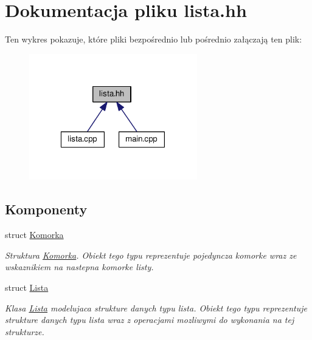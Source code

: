 \hypertarget{lista_8hh}{\section{Dokumentacja pliku lista.\-hh}
\label{lista_8hh}
}
Ten wykres pokazuje, które pliki bezpośrednio lub pośrednio załączają ten plik\-:
\nopagebreak
\begin{figure}[H]
\begin{center}
\leavevmode
\includegraphics[width=207pt]{lista_8hh__dep__incl}
\end{center}
\end{figure}
\subsection*{Komponenty}
\begin{DoxyCompactItemize}
\item 
struct \hyperlink{struct_komorka}{Komorka}
\begin{DoxyCompactList}\small\item\em Struktura \hyperlink{struct_komorka}{Komorka}. Obiekt tego typu reprezentuje pojedyncza komorke wraz ze wskaznikiem na nastepna komorke listy. \end{DoxyCompactList}\item 
struct \hyperlink{struct_lista}{Lista}
\begin{DoxyCompactList}\small\item\em Klasa \hyperlink{struct_lista}{Lista} modelujaca strukture danych typu lista. Obiekt tego typu reprezentuje strukture danych typu lista wraz z operacjami mozliwymi do wykonania na tej strukturze. \end{DoxyCompactList}\end{DoxyCompactItemize}
